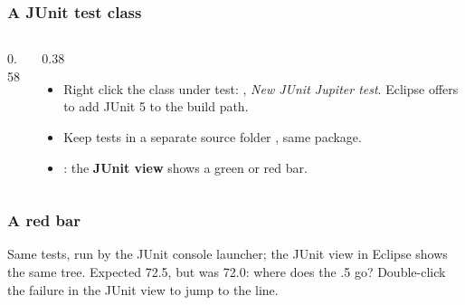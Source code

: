 \documentclass[aspectratio=169,10pt,compress]{beamer}
\begin{document}
\begin{frame}[t,fragile] \frametitle{A JUnit test class}
  \begin{columns}[T]
    \begin{column}{0.58\textwidth}
    \end{column}
    \begin{column}{0.38\textwidth}
      \begin{itemize}\small
        \item Right click the class under test: , \emph{New JUnit Jupiter test}.
              Eclipse offers to add JUnit 5 to the build path.
        \item Keep tests in a separate source folder , same package.
        \item {}: the \textbf{JUnit view} shows a green or red bar.
      \end{itemize}
    \end{column}
  \end{columns}
\end{frame}




\begin{frame}[t,fragile] \frametitle{A red bar}

  \vspace{0.1em}
  \small
  Same tests, run by the JUnit console launcher; the JUnit view in Eclipse shows the same tree. Expected 72.5, but was 72.0:
  where does the .5 go? Double-click the failure in the JUnit view to jump to the line.
\end{frame}

\end{document}
